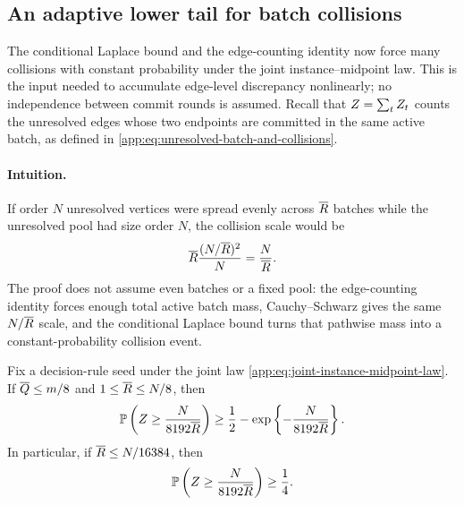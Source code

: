 \subsection{An adaptive lower tail for batch collisions}
\label{app:lower-proof-collision-tail}

The conditional Laplace bound and the edge-counting identity now force many collisions
with constant probability under the joint instance--midpoint law. This is
the input needed to accumulate edge-level discrepancy nonlinearly; no
independence between commit rounds is assumed. Recall that
\(Z=\sum_tZ_{t}\) counts the unresolved edges
whose two endpoints are committed in the same active batch, as defined in
\eqref{app:eq:unresolved-batch-and-collisions}.

\paragraph{Intuition.}
If order $N$ unresolved vertices were spread evenly across $\overline R$
batches while the unresolved pool had size order $N$, the collision scale
would be
\[
 \overline R\frac{(N/\overline R)^2}{N}
 =\frac{N}{\overline R}.
\]
The proof does not assume even batches or a fixed pool: the edge-counting identity
forces enough total active batch mass, Cauchy--Schwarz gives the same
$N/\overline R$ scale, and the conditional Laplace bound turns that
pathwise mass into a constant-probability collision event.

\begin{proposition}
\label{app:prop:collision-lower-tail}
Fix a decision-rule seed under the joint law
\eqref{app:eq:joint-instance-midpoint-law}. If
\(\overline Q{}\le m/8\) and \(1\le \overline R{}\le N/8\), then
\begin{equation}
 \mathbb P\left(
   Z\ge\frac{N}{8192\overline R{}}
 \right)
 \ge
 \frac12-\exp\left\{-\frac{N}{8192\overline R{}}\right\}.
 \label{app:eq:collision-lower-tail}
\end{equation}
In particular, if \(\overline R{}\le N/16384\), then
\begin{equation}
 \mathbb P\left(
   Z\ge\frac{N}{8192\overline R{}}
 \right)\ge\frac14.
 \label{app:eq:collision-quarter-probability}
\end{equation}
\end{proposition}

